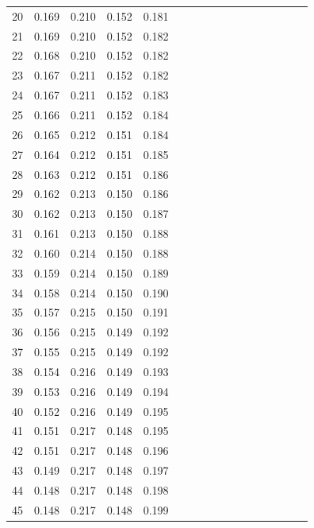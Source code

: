 \documentclass{report}
\begin{document}
\begin{appendices}
\begin{table}
\begin{tabular}{|c|cccc|cccc|cccc|cccc|}
20 & 0.169 & 0.210 & 0.152 & 0.181 & & & & & & & & & & & &\\
21 & 0.169 & 0.210 & 0.152 & 0.182 & & & & & & & & & & & &\\
22 & 0.168 & 0.210 & 0.152 & 0.182 & & & & & & & & & & & &\\
23 & 0.167 & 0.211 & 0.152 & 0.182 & & & & & & & & & & & &\\
24 & 0.167 & 0.211 & 0.152 & 0.183 & & & & & & & & & & & &\\
25 & 0.166 & 0.211 & 0.152 & 0.184 & & & & & & & & & & & &\\
26 & 0.165 & 0.212 & 0.151 & 0.184 & & & & & & & & & & & &\\
27 & 0.164 & 0.212 & 0.151 & 0.185 & & & & & & & & & & & &\\
28 & 0.163 & 0.212 & 0.151 & 0.186 & & & & & & & & & & & &\\
29 & 0.162 & 0.213 & 0.150 & 0.186 & & & & & & & & & & & &\\
30 & 0.162 & 0.213 & 0.150 & 0.187 & & & & & & & & & & & &\\
31 & 0.161 & 0.213 & 0.150 & 0.188 & & & & & & & & & & & &\\
32 & 0.160 & 0.214 & 0.150 & 0.188 & & & & & & & & & & & &\\
33 & 0.159 & 0.214 & 0.150 & 0.189 & & & & & & & & & & & &\\
34 & 0.158 & 0.214 & 0.150 & 0.190 & & & & & & & & & & & &\\
35 & 0.157 & 0.215 & 0.150 & 0.191 & & & & & & & & & & & &\\
36 & 0.156 & 0.215 & 0.149 & 0.192 & & & & & & & & & & & &\\
37 & 0.155 & 0.215 & 0.149 & 0.192 & & & & & & & & & & & &\\
38 & 0.154 & 0.216 & 0.149 & 0.193 & & & & & & & & & & & &\\
39 & 0.153 & 0.216 & 0.149 & 0.194 & & & & & & & & & & & &\\
40 & 0.152 & 0.216 & 0.149 & 0.195 & & & & & & & & & & & &\\
41 & 0.151 & 0.217 & 0.148 & 0.195 & & & & & & & & & & & &\\
42 & 0.151 & 0.217 & 0.148 & 0.196 & & & & & & & & & & & &\\
43 & 0.149 & 0.217 & 0.148 & 0.197 & & & & & & & & & & & &\\
44 & 0.148 & 0.217 & 0.148 & 0.198 & & & & & & & & & & & &\\
45 & 0.148 & 0.217 & 0.148 & 0.199 & & & & & & & & & & & &\\

\end{tabular}
\end{table}
\end{appendices}
\end{document}
